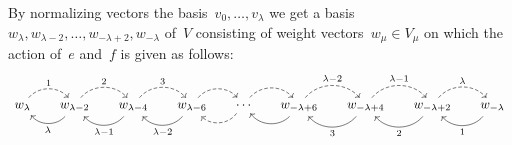 \begin{theorem}
\begin{enumerate}
      By normalizing vectors the basis~$v_0, \dotsc, v_\lambda$ we get a basis~$w_{\lambda}, w_{\lambda-2}, \dotsc, w_{-\lambda+2}, w_{-\lambda}$ of~$V$ consisting of weight vectors~$w_\mu \in V_{\mu}$ on which the action of~$e$ and~$f$ is given as follows:
      \begin{equation}
        \label{picture of finite dimensional verma irrep normalized}
        \begin{tikzcd}[column sep = 1.4em]
          w_{\lambda}
          \arrow[dashed, bend left = 50]{r}[above]{1}
          &
          w_{\lambda-2}
          \arrow[dashed, bend left = 50]{r}[above]{2}
          \arrow[bend left = 50]{l}[below]{\lambda}
          &
          w_{\lambda-4}
          \arrow[dashed, bend left = 50]{r}[above]{3}
          \arrow[bend left = 50]{l}[below]{\lambda-1}
          &
          w_{\lambda-6}
          \arrow[dashed, bend left = 50]{r}
          \arrow[bend left = 50]{l}[below]{\lambda-2}
          &
          \dotsb
          \arrow[dashed, bend left = 50]{r}
          \arrow[dashed, bend left = 50]{l}
          &
          w_{-\lambda+6}
          \arrow[dashed, bend left = 50]{r}[above]{\lambda-2}
          \arrow[bend left = 50]{l}
          &
          w_{-\lambda+4}
          \arrow[dashed, bend left = 50]{r}[above]{\lambda-1}
          \arrow[bend left = 50]{l}[below]{3}
          &
          w_{-\lambda+2}
          \arrow[dashed, bend left = 50]{r}[above]{\lambda}
          \arrow[bend left = 50]{l}[below]{2}
          &
          w_{-\lambda}
          \arrow[bend left = 50]{l}[below]{1}
        \end{tikzcd}
      \end{equation}
  \end{enumerate}
\end{theorem}


